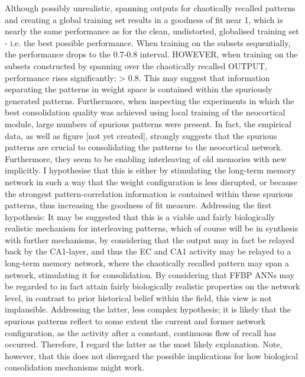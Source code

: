 Although possibly unrealistic, spanning outputs for chaotically recalled patterns and creating a global training set results in a goodness of fit near 1, which is nearly the same performance as for the clean, undistorted, globalised training set - i.e. the best possible performance.
When training on the subsets sequentially, the performance drops to the 0.7-0.8 interval. HOWEVER, when training on the subsets constructed by spanning over the chaotically recalled OUTPUT, performance rises significantly; > 0.8.
This may suggest that information separating the patterns in weight space is contained within the spuriously generated patterns. Furthermore, when inspecting the experiments in which the best consolidation quality was achieved using local training of the neocortical module, large numbers of spurious patterns were present. In fact, the empirical data, as well as figure [not yet created], strongly suggests that the spurious patterns are crucial to consolidating the patterns to the neocortical network. Furthermore, they seem to be enabling interleaving of old memories with new implicitly. I hypothesise that this is either by stimulating the long-term memory network in such a way that the weight configuration is less disrupted, or because the strongest pattern-correlation information is contained within these spurious patterns, thus increasing the goodness of fit measure. Addressing the first hypothesis: It may be suggested that this is a viable and fairly biologically realistic mechanism for interleaving patterns, which of course will be in synthesis with further mechanisms, by considering that the output may in fact be relayed back by the CA1-layer, and thus the EC and CA1 activity may be relayed to a long-term memory network, where the chaotically recalled pattern may span a network, stimulating it for consolidation. By considering that FFBP ANNs may be regarded to in fact attain fairly biologically realistic properties on the network level, in contrast to prior historical belief within the field, this view is not implausible.
Addressing the latter, less complex hypothesis; it is likely that the spurious patterns reflect to some extent the current and former network configuration, as the activity after a constant, continuous flow of recall has occurred. Therefore, I regard the latter as the most likely explanation. Note, however, that this does not disregard the possible implications for how biological consolidation mechanisms might work.



